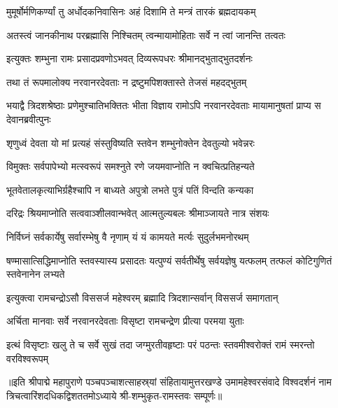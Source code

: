 \twolineshloka
{मुमूर्षोर्मणिकर्ण्यां तु अर्धोदकनिवासिनः}
{अहं दिशामि ते मन्त्रं तारकं ब्रह्मदायकम्} %

\twolineshloka
{अतस्त्वं जानकीनाथ परब्रह्मासि निश्चितम्}
{त्वन्मायामोहिताः सर्वे न त्वां जानन्ति तत्वतः} %


\twolineshloka
{इत्युक्तः शम्भुना रामः प्रसादप्रवणोऽभवत्}
{दिव्यरूपधरः श्रीमानद्भुताद्भुतदर्शनः} %

\twolineshloka
{तथा तं रूपमालोक्य नरवानरदेवताः}
{न द्रष्टुमपिशक्तास्ते तेजसं महदद्भुतम्} %

\threelineshloka
{भयाद्वै त्रिदशश्रेष्ठाः प्रणेमुश्चातिभक्तितः}
{भीता विज्ञाय रामोऽपि नरवानरदेवताः}
{मायामानुषतां प्राप्य स देवानब्रवीत्पुनः} %


\twolineshloka
{शृणुध्वं देवता यो मां प्रत्यहं संस्तुविष्यति}
{स्तवेन शम्भुनोक्तेन देवतुल्यो भवेन्नरः} %

\twolineshloka
{विमुक्तः सर्वपापेभ्यो मत्स्वरूपं समश्नुते}
{रणे जयमवाप्नोति न क्वचित्प्रतिहन्यते} %

\twolineshloka
{भूतवेतालकृत्याभिर्ग्रहैश्चापि न बाध्यते}
{अपुत्रो लभते पुत्रं पतिं विन्दति कन्यका} %

\twolineshloka
{दरिद्रः श्रियमाप्नोति सत्ववाञ्शीलवान्भवेत्}
{आत्मतुल्यबलः श्रीमाञ्जायते नात्र संशयः} %

\twolineshloka
{निर्विघ्नं सर्वकार्येषु सर्वारम्भेषु वै नृणाम्}
{यं यं कामयते मर्त्यः सुदुर्लभमनोरथम्} %

\threelineshloka
{षण्मासात्सिद्धिमाप्नोति स्तवस्यास्य प्रसादतः}
{यत्पुण्यं सर्वतीर्थेषु सर्वयज्ञेषु यत्फलम्}
{तत्फलं कोटिगुणितं स्तवेनानेन लभ्यते} %


\twolineshloka
{इत्युक्त्वा रामचन्द्रोऽसौ विससर्ज महेश्वरम्}
{ब्रह्मादि त्रिदशान्सर्वान् विससर्ज समागतान्} %

\twolineshloka
{अर्चिता मानवाः सर्वे नरवानरदेवताः}
{विसृष्टा रामचन्द्रेण प्रीत्या परमया युताः} %

\fourlineindentedshloka
{इत्थं विसृष्टाः खलु ते च सर्वे}
{सुखं तदा जग्मुरतीवहृष्टाः}
{परं पठन्तः स्तवमीश्वरोक्तं}
{रामं स्मरन्तो वरविश्वरूपम्} %

॥इति श्रीपाद्मे महापुराणे पञ्चपञ्चाशत्साहस्र्यां संहितायामुत्तरखण्डे उमामहेश्वरसंवादे विश्वदर्शनं नाम त्रिचत्वारिंशदधिकद्विशततमोऽध्याये श्री-शम्भुकृत-रामस्तवः सम्पूर्णः॥

